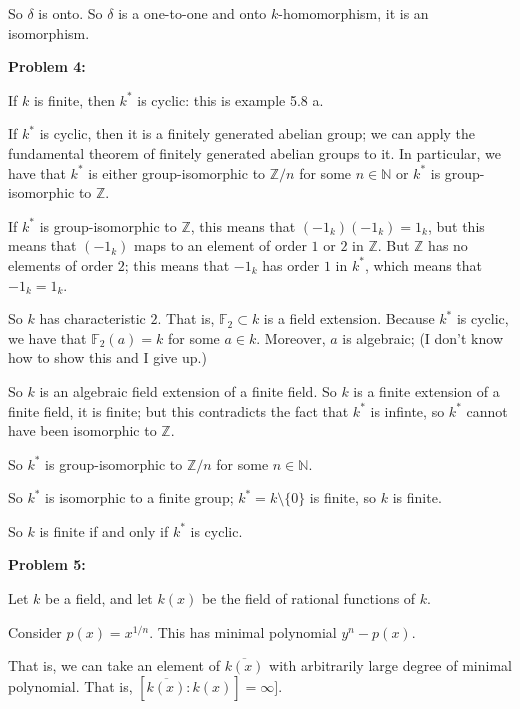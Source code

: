 \documentclass[a4paper,12pt]{article}
\newcommand{\shunt}{\vspace{20mm}}
\newcommand{\de}{\delta}
\newcommand{\N}{\mathbb{N}}
\newcommand{\Z}{\mathbb{Z}}
\begin{document}
So $\de$ is onto. So $\de$ is a one-to-one and onto $k$-homomorphism, it is an isomorphism.

\shunt

{\bf Problem 4:} 

If $k$ is finite, then $k^*$ is cyclic: this is example 5.8 a.

If $k^*$ is cyclic, then it is a finitely generated abelian group; we can apply the fundamental theorem of finitely generated abelian groups to it. In particular, we have that $k^*$ is either group-isomorphic to $\Z/n$ for some $n \in \N$ or $k^*$ is group-isomorphic to $\Z$.

If $k^*$ is group-isomorphic to $\Z$, this means that $(-1_k)(-1_k) = 1_k$, but this means that $(-1_k)$ maps to an element of order $1$ or $2$ in $\Z$. But $\Z$ has no elements of order $2$; this means that $-1_k$ has order $1$ in $k^*$, which means that $-1_k=1_k$. 

So $k$ has characteristic $2$. That is, $\mathbb{F}_2 \subset k$ is a field extension. Because $k^*$ is cyclic, we have that $\mathbb{F}_2(a) = k$ for some $a \in k$. Moreover, $a$ is algebraic; (I don't know how to show this and I give up.)

So $k$ is an algebraic field extension of a finite field. So $k$ is a finite extension of a finite field, it is finite; but this contradicts the fact that $k^*$ is infinte, so $k^*$ cannot have been isomorphic to $\Z$.

So $k^*$ is group-isomorphic to $\Z/n$ for some $n \in \N$.

So $k^*$ is isomorphic to a finite group; $k^* = k \setminus \{0\}$ is finite, so $k$ is finite.

So $k$ is finite if and only if $k^*$ is cyclic.

\shunt

{\bf Problem 5:} 

Let $k$ be a field, and let $k(x)$ be the field of rational functions of $k$.

Consider $p(x)= x^{1/n}$. This has minimal polynomial $y^n - p(x)$.

That is, we can take an element of $\overline{k(x)}$ with arbitrarily large degree of minimal polynomial. That is, $[\overline{k(x)}: k(x)] = \infty]$.

\shunt
\end{document}
